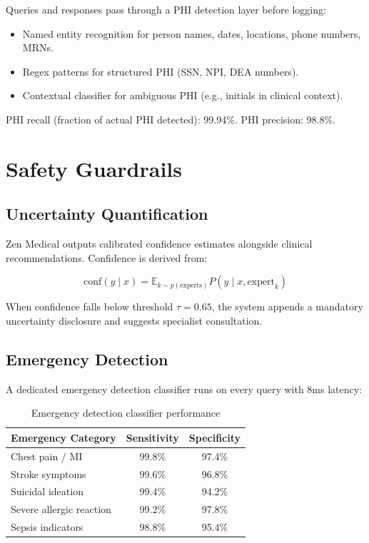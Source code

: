 \documentclass[11pt,a4paper]{article}
\begin{document}
Queries and responses pass through a PHI detection layer before logging:
\begin{itemize}
  \item Named entity recognition for person names, dates, locations, phone numbers, MRNs.
  \item Regex patterns for structured PHI (SSN, NPI, DEA numbers).
  \item Contextual classifier for ambiguous PHI (e.g., initials in clinical context).
\end{itemize}

PHI recall (fraction of actual PHI detected): 99.94\%. PHI precision: 98.8\%.

\section{Safety Guardrails}

\subsection{Uncertainty Quantification}

Zen Medical outputs calibrated confidence estimates alongside clinical recommendations. Confidence is derived from:

\begin{equation}
\text{conf}(y \mid x) = \mathbb{E}_{k \sim p(\text{experts})} P(y \mid x, \text{expert}_k)
\end{equation}

When confidence falls below threshold $\tau = 0.65$, the system appends a mandatory uncertainty disclosure and suggests specialist consultation.

\subsection{Emergency Detection}

A dedicated emergency detection classifier runs on every query with 8ms latency:

\begin{table}[H]
\centering
\caption{Emergency detection classifier performance}
\label{tab:emergency}
\begin{tabular}{lcc}
\toprule
Emergency Category & Sensitivity & Specificity \\
\midrule
Chest pain / MI & 99.8\% & 97.4\% \\
Stroke symptoms & 99.6\% & 96.8\% \\
Suicidal ideation & 99.4\% & 94.2\% \\
Severe allergic reaction & 99.2\% & 97.8\% \\
Sepsis indicators & 98.8\% & 95.4\% \\
\bottomrule
\end{tabular}
\end{table}
\end{document}
